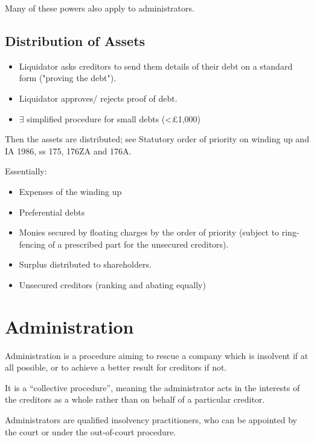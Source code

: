 \documentclass[
]{article}
\providecommand{\tightlist}{%
  \setlength{\itemsep}{0pt}\setlength{\parskip}{0pt}}
\begin{document}
Many of these powers also apply to administrators.

\hypertarget{distribution-of-assets}{%
\subsection{Distribution of Assets}\label{distribution-of-assets}}

\begin{itemize}
\tightlist
\item
  Liquidator asks creditors to send them details of their debt on a
  standard form ("proving the debt").
\item
  Liquidator approves/ rejects proof of debt.
\item
  {\(\exists\)} simplified procedure for small debts (\textless£1,000)
\end{itemize}

Then the assets are distributed; see Statutory order of priority on
winding up and IA 1986, ss 175, 176ZA and 176A.

Essentially:

\begin{itemize}
\tightlist
\item
  Expenses of the winding up
\item
  Preferential debts
\item
  Monies secured by floating charges by the order of priority (subject
  to ring-fencing of a prescribed part for the unsecured creditors).
\item
  Surplus distributed to shareholders.
\item
  Unsecured creditors (ranking and abating equally)
\end{itemize}

\hypertarget{administration}{%
\section{Administration}\label{administration}}

Administration is a procedure aiming to rescue a company which is
insolvent if at all possible, or to achieve a better result for
creditors if not.

It is a ``collective procedure'', meaning the administrator acts in the
interests of the creditors as a whole rather than on behalf of a
particular creditor.

Administrators are qualified insolvency practitioners, who can be
appointed by the court or under the out-of-court procedure.
\end{document}

